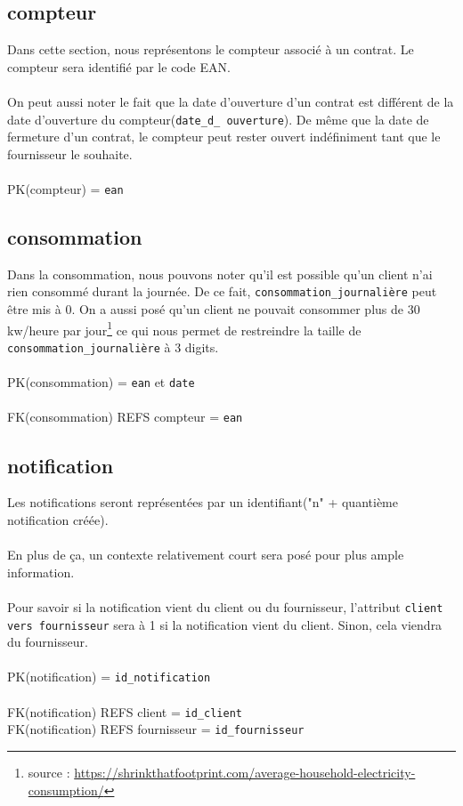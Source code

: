 \subsection{compteur}
Dans cette section, nous représentons le compteur associé à un contrat. Le compteur sera identifié par le code EAN. 
\\ \\
On peut aussi noter le fait que la date d'ouverture d'un contrat est différent de la date d'ouverture du compteur(\texttt{date\_d\_ ouverture}).
De même que la date de fermeture d'un contrat, le compteur peut rester ouvert indéfiniment tant que le fournisseur le souhaite.
\\ \\
PK(compteur) = \texttt{ean}
\subsection{consommation}
Dans la consommation, nous pouvons noter qu'il est possible qu'un client n'ai rien consommé durant la journée. De ce fait, \texttt{consommation\_journalière} peut être mis à 0. On a aussi posé qu'un
client ne pouvait consommer plus de 30 kw/heure par jour\footnote{source : \url{https://shrinkthatfootprint.com/average-household-electricity-consumption/}} ce qui nous permet de restreindre la taille de \texttt{consommation\_journalière} à 3 digits.
\\ \\
PK(consommation) = \texttt{ean} et \texttt{date}
\\ \\
FK(consommation) REFS compteur = \texttt{ean}
\newpage
\subsection{notification}
Les notifications seront représentées par un identifiant("n" + quantième notification créée).
\\ \\
En plus de ça, un contexte relativement court sera posé pour plus ample information.
\\ \\
Pour savoir si la notification vient du client ou du fournisseur, l'attribut \texttt{client vers fournisseur} sera à 1 si la notification vient du client. Sinon, cela viendra du fournisseur.
\\ \\
PK(notification) = \texttt{id\_notification}
\\ \\
FK(notification) REFS client = \texttt{id\_client}
\\
FK(notification) REFS fournisseur = \texttt{id\_fournisseur}

